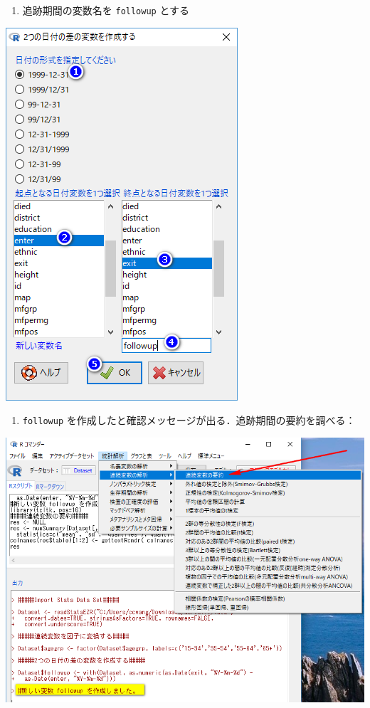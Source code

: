 \documentclass[11pt,]{problemset}
\providecommand{\tightlist}{%
  \setlength{\itemsep}{0pt}\setlength{\parskip}{0pt}}
\begin{document}
\begin{enumerate}
\def\labelenumi{\arabic{enumi}.}
\setcounter{enumi}{1}
\tightlist
\item
  追跡期間の変数名を \texttt{followup} とする
\end{enumerate}

\begin{center}\includegraphics[width=0.5\linewidth,height=0.35\textheight]{pic/survival01} \end{center}

\begin{enumerate}
\def\labelenumi{\arabic{enumi}.}
\setcounter{enumi}{2}
\tightlist
\item
  \texttt{followup}
  を作成したと確認メッセージが出る．追跡期間の要約を調べる：
\end{enumerate}

\begin{center}\includegraphics[width=0.7\linewidth,height=0.35\textheight]{pic/survival02} \end{center}
\end{document}
